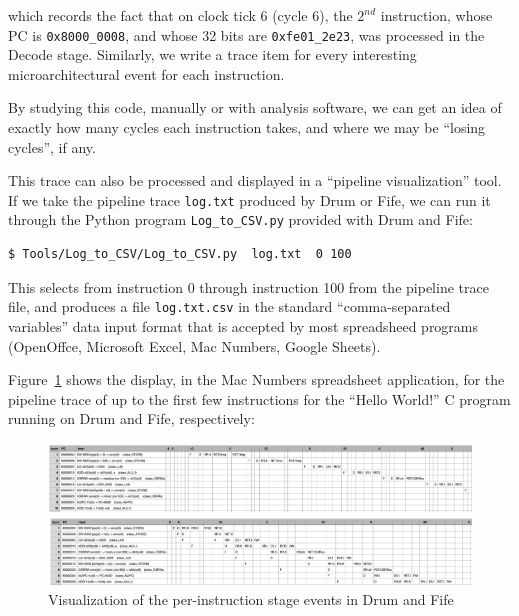 which records the fact that on clock tick 6 (cycle 6), the $2^{nd}$
instruction, whose PC is \verb|0x8000_0008|, and whose 32 bits are
\verb|0xfe01_2e23|, was processed in the Decode stage.  Similarly, we
write a trace item for every interesting microarchitectural event for
each instruction.

By studying this code, manually or with analysis software, we can get
an idea of exactly how many cycles each instruction takes, and where
we may be ``losing cycles'', if any.

This trace can also be processed and displayed in a ``pipeline
visualization'' tool.  If we take the pipeline trace \verb|log.txt|
produced by Drum or Fife, we can run it through the Python program
\verb|Log_to_CSV.py| provided with Drum and Fife:

{\small
\begin{Verbatim}[frame=single, label=log.txt]
  $ Tools/Log_to_CSV/Log_to_CSV.py  log.txt  0 100
\end{Verbatim}
}

This selects from instruction 0 through instruction 100 from the
pipeline trace file, and produces a file \verb|log.txt.csv| in the
standard ``comma-separated variables'' data input format that is
accepted by most spreadsheed programs (OpenOffce, Microsoft Excel, Mac
Numbers, Google Sheets).

Figure~\ref{Fig_PipeViz} shows the display, in the Mac Numbers
spreadsheet application, for the pipeline trace of up to the first few
instructions for the ``Hello World!'' C program running on Drum and
Fife, respectively:
\begin{figure}[htbp]
  \centerline{\includegraphics[width=6in,angle=0]{Figures/Fig_PipeViz_Drum}}
  \vspace*{1ex}
  \centerline{\includegraphics[width=6in,angle=0]{Figures/Fig_PipeViz_Fife}}
  \caption{\label{Fig_PipeViz}
           Visualization of the per-instruction stage events in Drum and Fife}
\end{figure}


